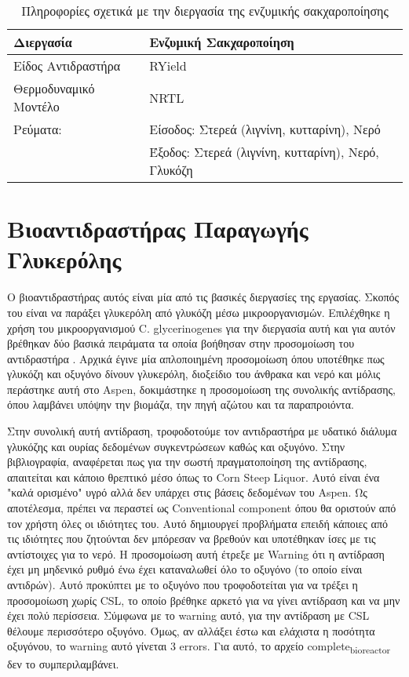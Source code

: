 \documentclass[11pt]{article}
\begin{document}
\begin{table}[htbp]
\caption{Πληροφορίες σχετικά με την διεργασία της ενζυμικής σακχαροποίησης}
\centering
\begin{tabular}{ll}
\hline
Διεργασία & Ενζυμική Σακχαροποίηση\\
\hline
Είδος Αντιδραστήρα & RYield\\
Θερμοδυναμικό Μοντέλο & NRTL\\
\hline
Ρεύματα: & Είσοδος: Στερεά (λιγνίνη, κυτταρίνη), Νερό\\
\hline
 & Έξοδος: Στερεά (λιγνίνη, κυτταρίνη), Νερό, Γλυκόζη\\
\hline
\end{tabular}
\end{table}

\section{Βιοαντιδραστήρας Παραγωγής Γλυκερόλης}
\label{sec:org6d9fe31}
Ο βιοαντιδραστήρας αυτός είναι μία από τις βασικές διεργασίες της εργασίας. Σκοπός του είναι να παράξει γλυκερόλη από γλυκόζη μέσω μικροοργανισμών. Επιλέχθηκε η χρήση του μικροοργανισμού C. glycerinogenes για την διεργασία αυτή και για αυτόν βρέθηκαν δύο βασικά πειράματα τα οποία βοήθησαν στην προσομοίωση του αντιδραστήρα \cite{zhugeGlycerolProductionNovel2001,jinByproductFormationNovel2003} . Αρχικά έγινε μία απλοποιημένη προσομοίωση όπου υποτέθηκε πως γλυκόζη και οξυγόνο δίνουν γλυκερόλη, διοξείδιο του άνθρακα και νερό και μόλις περάστηκε αυτή στο Aspen, δοκιμάστηκε η προσομοίωση της συνολικής αντίδρασης, όπου λαμβάνει υπόψην την βιομάζα, την πηγή αζώτου και τα παραπροιόντα.

Στην συνολική αυτή αντίδραση, τροφοδοτούμε τον αντιδραστήρα με υδατικό διάλυμα γλυκόζης και ουρίας δεδομένων συγκεντρώσεων καθώς και οξυγόνο. Στην βιβλιογραφία, αναφέρεται πως για την σωστή πραγματοποίηση της αντίδρασης, απαιτείται και κάποιο θρεπτικό μέσο όπως το Corn Steep Liquor. Αυτό είναι ένα "καλά ορισμένο" υγρό αλλά δεν υπάρχει στις βάσεις δεδομένων του Aspen. Ως αποτέλεσμα, πρέπει να περαστεί ως Conventional component όπου θα οριστούν από τον χρήστη όλες οι ιδιότητες του. Αυτό δημιουργεί προβλήματα επειδή κάποιες από τις ιδιότητες που ζητούνται δεν μπόρεσαν να βρεθούν και υποτέθηκαν ίσες με τις αντίστοιχες για το νερό. Η προσομοίωση αυτή έτρεξε με Warning ότι η αντίδραση έχει μη μηδενικό ρυθμό ένω έχει καταναλωθεί όλο το οξυγόνο (το οποίο είναι αντιδρών). Αυτό προκύπτει με το οξυγόνο που τροφοδοτείται για να τρέξει η προσομοίωση χωρίς CSL, το οποίο βρέθηκε αρκετό για να γίνει αντίδραση και να μην έχει πολύ περίσσεια. Σύμφωνα με το warning αυτό, για την αντίδραση με CSL θέλουμε περισσότερο οξυγόνο. Όμως, αν αλλάξει έστω και ελάχιστα η ποσότητα οξυγόνου, το warning αυτό γίνεται 3 errors. Για αυτό, το αρχείο complete\textsubscript{bioreactor} δεν το συμπεριλαμβάνει.
\end{document}
